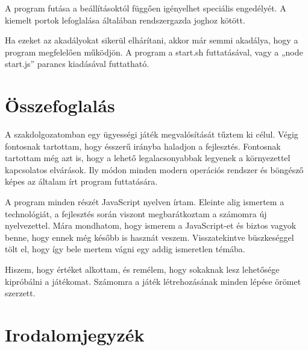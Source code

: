 \documentclass[]{article}
\begin{document}
A program futása a beállításoktól függően igényelhet speciális
engedélyét. A kiemelt portok lefoglalása általában rendszergazda joghoz
kötött.

Ha ezeket az akadályokat sikerül elhárítani, akkor már semmi akadálya,
hogy a program megfelelően működjön. A program a start.sh futtatásával,
vagy a „node start.js'' parancs kiadásával futtatható.

\hypertarget{uxf6sszefoglaluxe1s}{%
\section{Összefoglalás}\label{uxf6sszefoglaluxe1s}}

A szakdolgozatomban egy ügyességi játék megvalósítását tűztem ki célul.
Végig fontosnak tartottam, hogy ésszerű irányba haladjon a fejlesztés.
Fontosnak tartottam még azt is, hogy a lehető legalacsonyabbak legyenek
a környezettel kapcsolatos elvárások. Ily módon minden modern operációs
rendszer és böngésző képes az általam írt program futtatására.

A program minden részét JavaScript nyelven írtam. Eleinte alig ismertem
a technológiát, a fejlesztés során viszont megbarátkoztam a számomra új
nyelvezettel. Mára mondhatom, hogy ismerem a JavaScript-et és biztos
vagyok benne, hogy ennek még később is hasznát veszem. Visszatekintve
büszkeséggel tölt el, hogy így bele mertem vágni egy addig ismeretlen
témába.

Hiszem, hogy értéket alkottam, és remélem, hogy sokaknak lesz lehetősége
kipróbálni a játékomat. Számomra a játék létrehozásának minden lépése
örömet szerzett.

\hypertarget{irodalomjegyzuxe9k}{%
\section{Irodalomjegyzék}\label{irodalomjegyzuxe9k}}
\end{document}
